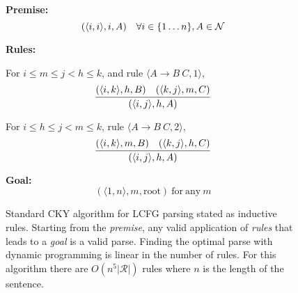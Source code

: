 \documentclass[11pt,letterpaper]{article}
\newcommand{\rules}{\mathcal{R}}
\newcommand{\Left}[1]{#1_{\Leftarrow}}
\newcommand{\Right}[1]{#1_{\Rightarrow}}
\newcommand{\Span}[1]{\langle #1 \rangle}
\newcommand{\tri}{\Span{\Left{m}, \Right{m}}}
\begin{document}
\begin{figure}
  \noindent \textbf{Premise:}
  \[(\Span{i, i}, i, A)\ \ \ \forall i \in \{1 \ldots n\}, A \in {\cal N}\]

  \noindent\textbf{Rules:}


   For $i\leq m \leq j < h \leq k$,  and  rule  $\langle A \rightarrow B\ C, 1\rangle$,
   \[\infer{( \Span{i, j},  h,  A)}{( \Span{i, k}, h, B)  &  ( \Span{k, j}, m, C) } \]

   For $i\leq h \leq j < m \leq k$, rule  $\langle A \rightarrow B\ C,  2\rangle$,
   \[\infer{(\Span{i, j},  h, A)}{(\Span{i, k}, m, B)  &  (\Span{k, j}, h, C) }  \]

\noindent \textbf{Goal:}\[ (\Span{1, n}, m, \mathrm{root}) \mathrm{\ for\ any }\ m\]
\label{fig:cky}
\caption{Standard CKY algorithm for LCFG parsing stated as inductive rules. Starting from the \textit{premise}, any valid application of \textit{rules} that leads to a \textit{goal} is a valid parse. Finding the optimal parse with dynamic programming is linear in the number of rules. For this algorithm there are $O(n^5|\rules|)$ rules where $n$ is the length of the sentence.}

\end{figure}


\end{document}
